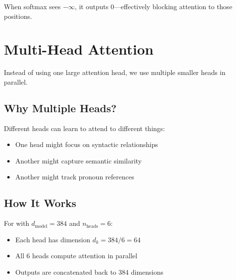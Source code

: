 When softmax sees $-\infty$, it outputs 0---effectively blocking attention to those positions.

\section{Multi-Head Attention}

Instead of using one large attention head, we use multiple smaller heads in parallel.

\subsection{Why Multiple Heads?}

Different heads can learn to attend to different things:
\begin{itemize}
    \item One head might focus on syntactic relationships
    \item Another might capture semantic similarity
    \item Another might track pronoun references
\end{itemize}

\subsection{How It Works}

For \TryLM with $d_{\text{model}} = 384$ and $n_{\text{heads}} = 6$:

\begin{itemize}
    \item Each head has dimension $d_k = 384 / 6 = 64$
    \item All 6 heads compute attention in parallel
    \item Outputs are concatenated back to 384 dimensions
\end{itemize}

